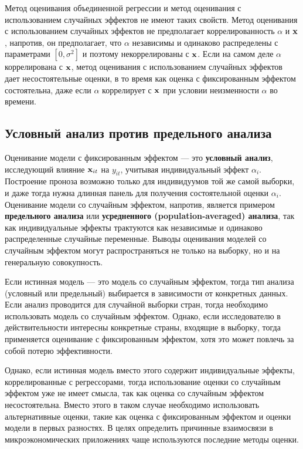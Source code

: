 Метод оценивания объединенной регрессии и метод оценивания с использованием случайных эффектов не имеют таких свойств. Метод оценивания с использованием случайных эффектов не предполагает коррелированность $\alpha$ и $\mathbf{x}$, напротив, он предполагает, что 
 $\alpha$ независимы и одинаково распределены с параметрами $[0,\sigma^2]$ и поэтому некоррелированы с $\mathbf{x}$. Если на самом деле $\alpha$ коррелирована с $\mathbf{x}$, метод оценивания с использованием случайных эффектов дает несостоятельные оценки, в то время как оценка с фиксированным эффектом состоятельна, даже если $\alpha$ коррелирует с $\mathbf{x}$ при условии неизменности  $\alpha$ во времени. 

\subsection{Условный анализ против предельного анализа}

Оценивание модели с фиксированным эффектом  --- это \textbf{условный анализ}, исследующий влияние $\mathbf{x}_{it}$ на $y_{it}$, учитывая индивидуальный эффект $\alpha_i$. Построение проноза возможно только для индивидуумов той же самой выборки, и даже тогда нужна длинная панель для получения состоятельной оценки $\alpha_i$. Оценивание модели со случайным эффектом, напротив, является примером \textbf{предельного анализа} или \textbf{усредненного (population-averaged) анализа}, так как индивидуальные эффекты трактуются как независимые и одинаково распределенные случайные переменные. Выводы оценивания моделей со случайным эффектом могут распространяться не только на выборку, но и на генеральную совокупность.

Если истинная модель  --- это модель со случайным эффектом, тогда тип анализа (условный или предельный) выбирается в зависимости от конкретных данных. Если анализ проводится для случайной выборки стран, тогда необходимо использовать модель со случайным эффектом. Однако, если исследователю в действительности интересны конкретные страны, входящие в выборку, тогда применяется оценивание с фиксированным эффектом, хотя это может повлечь за собой потерю эффективности. 

Однако, если истинная модель вместо этого содержит индивидуальные эффекты, коррелированные с регрессорами, тогда использование оценки со случайным эффектом уже не имеет смысла, так как оценка со случайным эффектом несостоятельна. Вместо этого в таком случае необходимо использовать альтернативные оценки, такие как оценка с фиксированным эффектом и оценки модели в первых разностях. В целях определить причинные взаимосвязи в микроэкономических приложениях чаще используются последние методы оценки.

